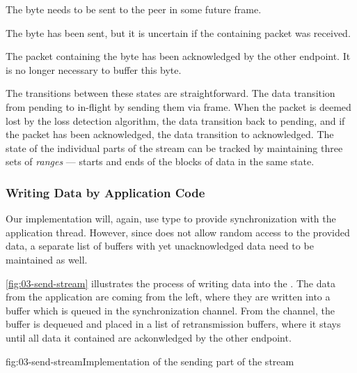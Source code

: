 \begin{itemize}

   The byte needs to be sent to the peer in some future \STREAM{} frame.

   The byte has been sent, but it is uncertain if the containing packet was
received.

   The packet containing the byte has been acknowledged by the other endpoint. It is no longer necessary to buffer this byte.

\end{itemize}

The transitions between these states are straightforward. The data transition from pending to
in-flight by sending them via \STREAM{} frame. When the packet is deemed lost by the loss detection
algorithm, the data transition back to pending, and if the packet has been acknowledged, the data
transition to acknowledged. The state of the individual parts of the stream can be tracked by
maintaining three sets of \textit{ranges} --- starts and ends of the blocks of data in the same state.

\subsubsection{Writing Data by Application Code}

Our implementation will, again, use  type to provide synchronization with the
application thread. However, since  does not allow random access to the provided
data, a separate list of buffers with yet unacknowledged data need to be maintained as well.

\autoref{fig:03-send-stream} illustrates the process of writing data into the \SendStream{}. The
data from the application are coming from the left, where they are written into a buffer which is
queued in the synchronization channel. From the channel, the buffer is dequeued and placed in a list
of retransmission buffers, where it stays until all data it contained are ackonwledged by the other
endpoint.


\begin{myFigure}{fig:03-send-stream}{Implementation of the sending part of the stream}

  \resizebox{\linewidth}{!}{}

\end{myFigure}


